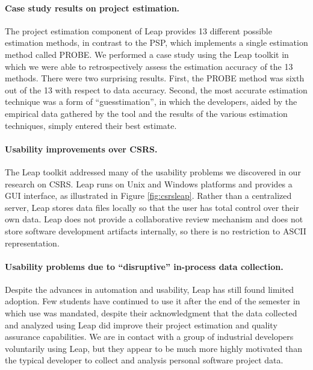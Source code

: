 \vspace*{-.15in} \paragraph{Case study results on project estimation.} 
The project estimation component of Leap provides 13 different possible
estimation methods, in contrast to the PSP, which implements a single
estimation method called PROBE.  We performed a case study using the Leap
toolkit in which we were able to retrospectively assess the estimation
accuracy of the 13 methods.  There were two surprising results. First, the
PROBE method was sixth out of the 13 with respect to data accuracy. Second,
the most accurate estimation technique was a form of ``guesstimation'', in
which the developers, aided by the empirical data gathered by the tool and
the results of the various estimation techniques, simply entered their best
estimate.
 
\vspace*{-.15in} \paragraph{Usability improvements over CSRS.}
The Leap toolkit addressed many of the usability problems we discovered in
our research on CSRS.  Leap runs on Unix and Windows platforms and provides
a GUI interface, as illustrated in Figure \ref{fig:csrsleap}. Rather than a
centralized server, Leap stores data files locally so that the user has
total control over their own data.  Leap does not provide a collaborative
review mechanism and does not store software development artifacts
internally, so there is no restriction to ASCII representation.
  
\vspace*{-.15in} \paragraph{Usability problems due to ``disruptive'' in-process data
  collection.}  Despite the advances in automation and usability, Leap has
still found limited adoption.  Few students have continued to use it after
the end of the semester in which use was mandated, despite their
acknowledgment that the data collected and analyzed using Leap did improve
their project estimation and quality assurance capabilities.  We are in
contact with a group of industrial developers voluntarily using Leap, but
they appear to be much more highly motivated than the typical developer to
collect and analysis personal software project data.

